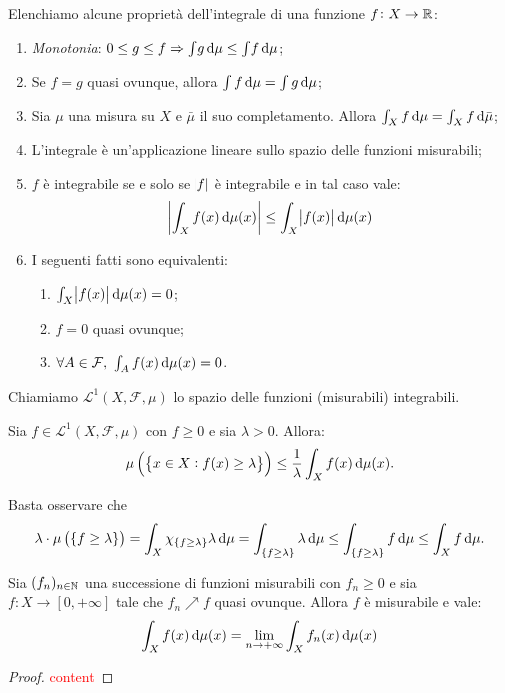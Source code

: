 Elenchiamo alcune proprietà dell'integrale di una funzione $ f\colon X\to \mathbb{R} $:
\begin{enumerate}
    \item \emph{Monotonia}: $ 0 \leq g \leq f \Rightarrow \int\! g\dif\mu \leq \int\! f\dif\mu $;
    \item \label{it:quasi_ovunque}Se $ f=g $ quasi ovunque, allora $ \int f\dif\mu = \int g\dif\mu $;
    \item Sia $ \mu $ una misura su $ X $ e $ \bar{\mu} $ il suo completamento. Allora $ \int_X f\dif\mu = \int_X f\dif\bar{\mu} $;
    \item L'integrale è un'applicazione lineare sullo spazio delle funzioni misurabili;
    \item $ f $ è integrabile se e solo se $ \abs{f} $ è integrabile e in tal caso vale:
    \[ \abs{ \int_X f(x)\dif\mu(x)} \leq \int_X \abs{f(x)}\dif\mu(x) \]
    \item I seguenti fatti sono equivalenti:
    \begin{enumerate}[label=(\roman*)]
        \item $ \int_X \abs{f(x)}\dif\mu(x) = 0$;
        \item $ f = 0 $ quasi ovunque;
        \item $ \forall A\in\mathcal{F}, \ \int_A f(x)\dif\mu(x) = 0 $.
    \end{enumerate}
\end{enumerate}

\begin{definition}
    Chiamiamo $ \mathscr{L}^1(X,\mathcal{F},\mu) $ lo spazio delle funzioni (misurabili) integrabili.
\end{definition}

\begin{exercise}
    Sia $ f\in\mathscr{L}^1(X,\mathcal{F},\mu) $ con $ f\geq 0 $ e sia $ \lambda > 0 $. Allora:
    \[ \mu\left( \left\{ x\in X : f(x) \ge \lambda \right\}  \right) \leq \frac{1}{\lambda}\int_X f(x)\dif\mu(x). \]
\end{exercise}
\begin{solution}
    Basta osservare che 
    \[
    \lambda \cdot \mu\left( \{ f \geq \lambda \} \right) = \int_X \chi_{ \{f\geq\lambda \} } \lambda \dif\mu = \int_{ \{ f \geq \lambda \} } \lambda \dif\mu \leq \int_{ \{ f \geq \lambda \} } f\dif\mu \leq \int_X f\dif\mu. 
    \] 
\end{solution}

\begin{thm}
    Sia $ (f_n)_{n\in\mathbb{N}} $ una successione di funzioni misurabili con $ f_n \geq 0 $ e sia $ f\colon X\to[0,+\infty] $ tale che $ f_n\nearrow f $ quasi ovunque. Allora $ f $ è misurabile e vale:
    \[ \int_X f(x)\dif\mu(x) = \lim_{n\to+\infty} \int_X f_n(x)\dif\mu(x) \]
\end{thm}
\begin{proof}
    \textcolor{red}{content}
\end{proof}

